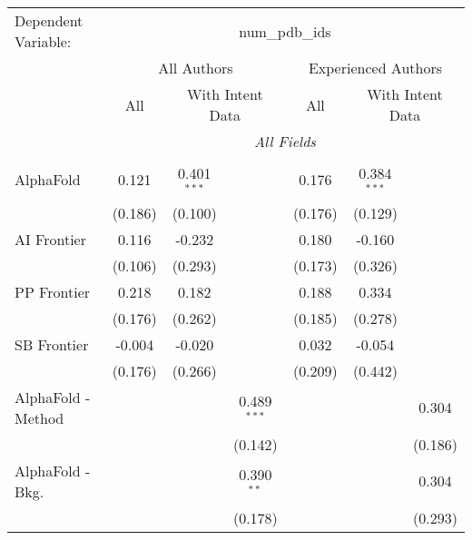 \begingroup
\centering
\begin{tabular}{lcccccc}
   \tabularnewline \midrule \midrule
   Dependent Variable: & \multicolumn{6}{c}{num\_pdb\_ids}\\
 & \multicolumn{3}{c}{All Authors} & \multicolumn{3}{c}{Experienced Authors} \\
\cmidrule(lr){2-4} \cmidrule(lr){5-7}
 & \multicolumn{1}{c}{All} & \multicolumn{2}{c}{With Intent Data} & \multicolumn{1}{c}{All} & \multicolumn{2}{c}{With Intent Data} \\
\cmidrule(lr){2-2} \cmidrule(lr){3-4} \cmidrule(lr){5-5} \cmidrule(lr){6-7}
 & \multicolumn{6}{c}{\textit{All Fields}} \\ \\
   AlphaFold                     & 0.121   & 0.401$^{***}$ &                & 0.176   & 0.384$^{***}$ &   \\   
                                 & (0.186) & (0.100)       &                & (0.176) & (0.129)       &   \\   
   AI Frontier                   & 0.116   & -0.232        &                & 0.180   & -0.160        &   \\   
                                 & (0.106) & (0.293)       &                & (0.173) & (0.326)       &   \\   
   PP Frontier                   & 0.218   & 0.182         &                & 0.188   & 0.334         &   \\   
                                 & (0.176) & (0.262)       &                & (0.185) & (0.278)       &   \\   
   SB Frontier                   & -0.004  & -0.020        &                & 0.032   & -0.054        &   \\   
                                 & (0.176) & (0.266)       &                & (0.209) & (0.442)       &   \\   
   AlphaFold - Method            &         &               & 0.489$^{***}$  &         &               & 0.304\\   
                                 &         &               & (0.142)        &         &               & (0.186)\\   
   AlphaFold - Bkg.              &         &               & 0.390$^{**}$   &         &               & 0.304\\   
                                 &         &               & (0.178)        &         &               & (0.293)\\   

\end{tabular}
